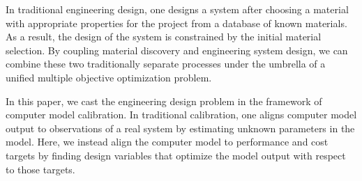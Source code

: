 \documentclass[12pt]{article}
\begin{document}
%
In traditional engineering design, one designs a system after choosing a material with appropriate properties for the project from a database of known materials.
%
%
As a result, the design of the system is constrained by the initial material selection.
%
By coupling material discovery and engineering system design, we can combine these two traditionally separate processes under the umbrella of a unified multiple objective optimization problem.
%

%
In this paper, we cast the engineering design problem in the framework of computer model calibration.
%
In traditional calibration, one aligns computer model output to observations of a real system by estimating unknown parameters in the model.
%
Here, we instead align the computer model to performance and cost targets by finding design variables that optimize the model output with respect to those targets.
%

%
%
\end{document}
